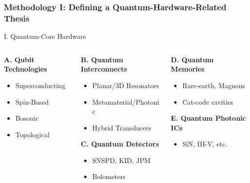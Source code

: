 \documentclass[aspectratio=169]{beamer}
\begin{document}
\begin{frame}[fragile]
    \frametitle{Methodology I: Defining a Quantum-Hardware-Related Thesis}

    \begin{block}{I. Quantum-Core Hardware}
    \footnotesize
    \begin{columns}[T,totalwidth=\textwidth]
        \begin{column}{0.33\textwidth}
            \textbf{A. Qubit Technologies}
            \begin{itemize}
                \item Superconducting
                \item Spin-Based
                \item Bosonic
                \item Topological
            \end{itemize}
            \vspace{1em}
        \end{column}
        \begin{column}{0.33\textwidth}
            \textbf{B. Quantum Interconnects}
            \begin{itemize}
                \item Planar/3D Resonators
                \item Metamaterial/Photonic
                \item Hybrid Transducers
            \end{itemize}
            \vspace{1em}
            \textbf{C. Quantum Detectors}
            \begin{itemize}
                \item SNSPD, KID, JPM
                \item Bolometers
            \end{itemize}
        \end{column}
        \begin{column}{0.33\textwidth}
            \textbf{D. Quantum Memories}
            \begin{itemize}
                \item Rare-earth, Magnons
                \item Cat-code cavities
            \end{itemize}
            \vspace{1em}
            \textbf{E. Quantum Photonic ICs}
            \begin{itemize}
                \item SiN, III-V, etc.
            \end{itemize}
        \end{column}
    \end{columns}
    \end{block}


\end{frame}
\end{document}
